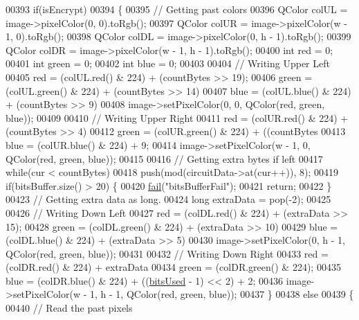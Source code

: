 \begin{DoxyCode}
00393     \textcolor{keywordflow}{if}(isEncrypt)
00394     \{
00395         \textcolor{comment}{// Getting past colors}
00396         QColor colUL = image->pixelColor(0, 0).toRgb();
00397         QColor colUR = image->pixelColor(w - 1, 0).toRgb();
00398         QColor colDL = image->pixelColor(0, h - 1).toRgb();
00399         QColor colDR = image->pixelColor(w - 1, h - 1).toRgb();
00400         \textcolor{keywordtype}{int} red = 0;
00401         \textcolor{keywordtype}{int} green = 0;
00402         \textcolor{keywordtype}{int} blue = 0;
00403 
00404         \textcolor{comment}{// Writing Upper Left}
00405         red = (colUL.red() & 224) + (countBytes >> 19);
00406         green = (colUL.green() & 224) + (countBytes >> 14) %
00407         blue = (colUL.blue() & 224) + (countBytes >> 9) %
00408         image->setPixelColor(0, 0, QColor(red, green, blue));
00409 
00410         \textcolor{comment}{// Writing Upper Right}
00411         red = (colUR.red() & 224) + (countBytes >> 4) %
00412         green = (colUR.green() & 224) + ((countBytes %
00413         blue = (colUR.blue() & 224) + 9;
00414         image->setPixelColor(w - 1, 0, QColor(red, green, blue));
00415 
00416         \textcolor{comment}{// Getting extra bytes if left}
00417         \textcolor{keywordflow}{while}(cur < countBytes)
00418             push(mod(circuitData->at(cur++)), 8);
00419         \textcolor{keywordflow}{if}(bitsBuffer.size() > 20) \{
00420             \hyperlink{class_model_p_c_a47464b59b7e37fcee25e55475708aabd}{fail}(\textcolor{stringliteral}{"bitsBufferFail"});
00421             \textcolor{keywordflow}{return};
00422         \}
00423         \textcolor{comment}{// Getting extra data as long.}
00424         \textcolor{keywordtype}{long} extraData = pop(-2);
00425 
00426         \textcolor{comment}{// Writing Down Left}
00427         red = (colDL.red() & 224) + (extraData >> 15);
00428         green = (colDL.green() & 224) + (extraData >> 10) %
00429         blue = (colDL.blue() & 224) + (extraData >> 5) %
00430         image->setPixelColor(0, h - 1, QColor(red, green, blue));
00431 
00432         \textcolor{comment}{// Writing Down Right}
00433         red = (colDR.red() & 224) + extraData %
00434         green = (colDR.green() & 224);
00435         blue = (colDR.blue() & 224) + ((\hyperlink{class_model_p_c_a655deb6a8afa94c7f4aadb3056989038}{bitsUsed} - 1) << 2) + 2;
00436         image->setPixelColor(w - 1, h - 1, QColor(red, green, blue));
00437     \}
00438     \textcolor{keywordflow}{else}
00439     \{
00440         \textcolor{comment}{// Read the past pixels}

\end{DoxyCode}
